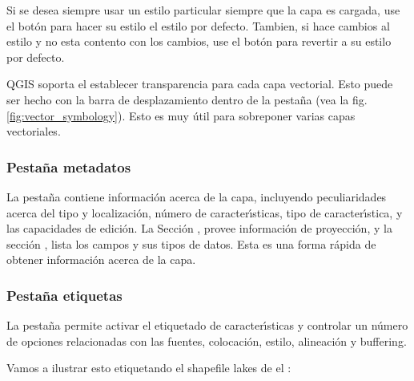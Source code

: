 Si se desea siempre usar un estilo particular siempre que la capa es cargada, 
use el bot\'on  para hacer su estilo el estilo por defecto. Tambien, 
si hace cambios al estilo y no esta contento con los cambios, use el bot\'on  para revertir a su estilo por defecto.

 \label{sec:vect_transparency} 
QGIS \CURRENT soporta el establecer transparencia para cada capa vectorial. Esto puede ser hecho con
la barra de desplazamiento  dentro de la pesta\~na  (vea la fig. \ref{fig:vector_symbology}).
Esto es muy \'util para sobreponer varias capas vectoriales.

\subsubsection{Pesta\~na metadatos}

La pesta\~na  contiene informaci\'on acerca de la capa, incluyendo peculiaridades
acerca del tipo y localizaci\'on, n\'umero de caracter\'{\i}sticas, tipo de caracter\'{\i}stica, y las capacidades de edici\'on.
La Secci\'on , provee 
informaci\'on de proyecci\'on, y la secci\'on ,
lista los campos y sus tipos de datos. Esta es una forma r\'apida de obtener informaci\'on acerca de la capa.

\subsubsection{Pesta\~na etiquetas}

La pesta\~na  permite activar el etiquetado de caracter\'{\i}sticas y controlar un n\'umero de opciones
relacionadas con las fuentes, colocaci\'on, estilo, alineaci\'on y buffering.

Vamos a ilustrar esto etiquetando el shapefile lakes de el 
:

